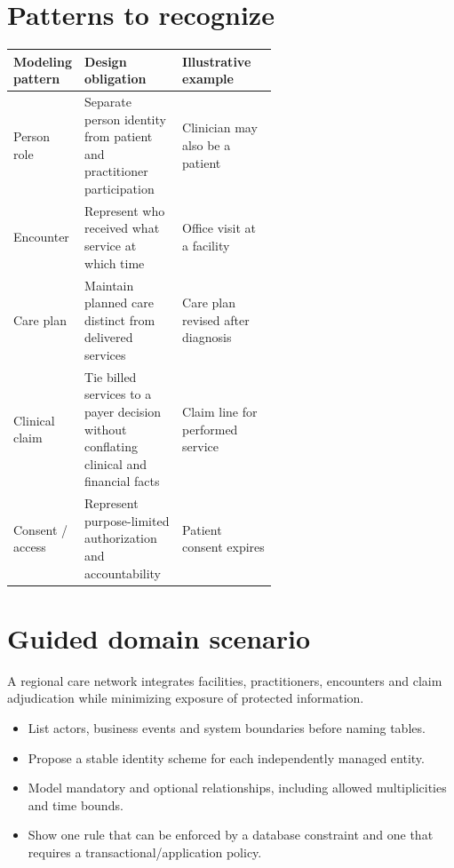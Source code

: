 \documentclass[11pt,letterpaper]{article}
\begin{document}
\section{Patterns to recognize}
\begin{tabularx}{\linewidth}{@{}>{\raggedright\arraybackslash}p{0.22\linewidth} >{\raggedright\arraybackslash}p{0.37\linewidth}>{\raggedright\arraybackslash}X@{}}
\toprule
\textbf{Modeling pattern} & \textbf{Design obligation} & \textbf{Illustrative example} \\ 
\midrule
Person role & Separate person identity from patient and practitioner participation & Clinician may also be a patient \\ 
Encounter & Represent who received what service at which time & Office visit at a facility \\ 
Care plan & Maintain planned care distinct from delivered services & Care plan revised after diagnosis \\ 
Clinical claim & Tie billed services to a payer decision without conflating clinical and financial facts & Claim line for performed service \\ 
Consent / access & Represent purpose-limited authorization and accountability & Patient consent expires \\ 
\bottomrule
\end{tabularx}

\section{Guided domain scenario}
A regional care network integrates facilities, practitioners, encounters and claim adjudication while minimizing exposure of protected information.

\begin{itemize}
\item List actors, business events and system boundaries before naming tables.
\item Propose a stable identity scheme for each independently managed entity.
\item Model mandatory and optional relationships, including allowed multiplicities and time bounds.
\item Show one rule that can be enforced by a database constraint and one that requires a transactional/application policy.
\end{itemize}
\end{document}
